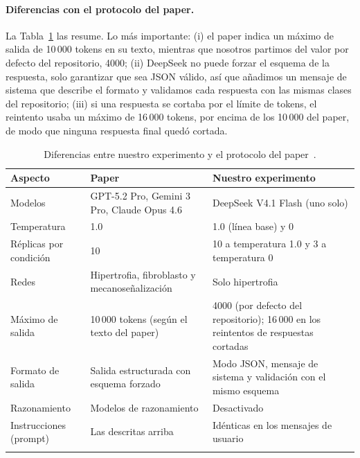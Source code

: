 \documentclass[unnumsec,webpdf,contemporary,large]{oup-authoring-template}
\begin{document}
\paragraph{Diferencias con el protocolo del paper.} La Tabla~\ref{tab:diferencias} las resume. Lo más importante: (i) el paper indica un máximo de salida de 10\,000 tokens en su texto, mientras que nosotros partimos del valor por defecto del repositorio, 4000; (ii) DeepSeek no puede forzar el esquema de la respuesta, solo garantizar que sea JSON válido, así que añadimos un mensaje de sistema que describe el formato y validamos cada respuesta con las mismas clases del repositorio; (iii) si una respuesta se cortaba por el límite de tokens, el reintento usaba un máximo de 16\,000 tokens, por encima de los 10\,000 del paper, de modo que ninguna respuesta final quedó cortada.

\begin{table}[t]
\caption{Diferencias entre nuestro experimento y el protocolo del paper~\cite{tewari2026}.\label{tab:diferencias}}
\begin{tabular*}{\textwidth}{@{\extracolsep\fill}p{3.3cm}p{6.2cm}p{6.2cm}@{}}
\toprule
Aspecto & Paper & Nuestro experimento \\
\midrule
Modelos & GPT-5.2 Pro, Gemini 3 Pro, Claude Opus 4.6 & DeepSeek V4.1 Flash (uno solo) \\
Temperatura & 1.0 & 1.0 (línea base) y 0 \\
Réplicas por condición & 10 & 10 a temperatura 1.0 y 3 a temperatura 0 \\
Redes & Hipertrofia, fibroblasto y mecanoseñalización & Solo hipertrofia \\
Máximo de salida & 10\,000 tokens (según el texto del paper) & 4000 (por defecto del repositorio); 16\,000 en los reintentos de respuestas cortadas \\
Formato de salida & Salida estructurada con esquema forzado & Modo JSON, mensaje de sistema y validación con el mismo esquema \\
Razonamiento & Modelos de razonamiento & Desactivado \\
Instrucciones (prompt) & Las descritas arriba & Idénticas en los mensajes de usuario \\
\botrule
\end{tabular*}
\end{table}
\end{document}
